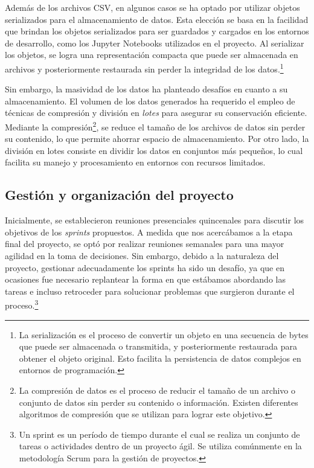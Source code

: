 Además de los archivos CSV, en algunos casos se ha optado por utilizar objetos serializados para el 
almacenamiento de datos. Esta elección se basa en la facilidad que brindan los objetos serializados 
para ser guardados y cargados en los entornos de desarrollo, como los Jupyter Notebooks utilizados 
en el proyecto. Al serializar los objetos, se logra una representación compacta que puede ser 
almacenada en archivos y posteriormente restaurada sin perder la integridad de los 
datos.\footnote{La serialización es el proceso de convertir un objeto en una secuencia de 
bytes que puede ser almacenada o transmitida, y posteriormente restaurada para obtener el 
objeto original. Esto facilita la persistencia de datos complejos en entornos de programación.}

Sin embargo, la masividad de los datos ha planteado desafíos en cuanto a su almacenamiento. 
El volumen de los datos generados ha requerido el empleo de técnicas de compresión y división 
en \textit{lotes} para asegurar su conservación eficiente. Mediante la compresión\footnote{La compresión 
de datos es el proceso de reducir el tamaño de un 
archivo o conjunto de datos sin perder su contenido o información. Existen diferentes 
algoritmos de compresión que se utilizan para lograr este objetivo.}, se reduce el tamaño 
de los archivos de datos sin perder su contenido, lo que permite ahorrar espacio de 
almacenamiento. Por otro lado, la división 
en lotes consiste en dividir los datos en conjuntos más pequeños, lo cual facilita su manejo y 
procesamiento en entornos con recursos limitados.

\subsection{Gestión y organización del proyecto}

Inicialmente, se establecieron reuniones presenciales quincenales para discutir los objetivos de 
los \textit{sprints} propuestos. A medida que nos acercábamos a la etapa final del proyecto, se optó por 
realizar reuniones semanales para una mayor agilidad en la toma de decisiones. Sin embargo, debido 
a la naturaleza del proyecto, gestionar adecuadamente los sprints ha sido un desafío, ya que en 
ocasiones fue necesario replantear la forma en que estábamos abordando las tareas e incluso 
retroceder para solucionar problemas que surgieron durante el proceso.\footnote{Un sprint es un 
período de tiempo durante el cual se realiza un conjunto de tareas o actividades dentro de un 
proyecto ágil. Se utiliza comúnmente en la metodología Scrum para la gestión de proyectos.}

